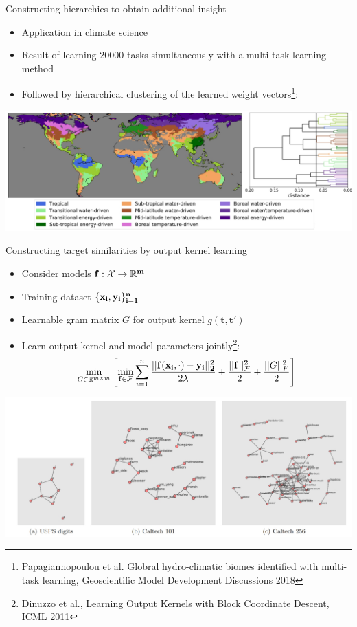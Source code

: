 \documentclass[]{beamer}
\renewcommand{\vec}[1]{\boldsymbol{#1}}
\begin{document}
\begin{frame}{Constructing hierarchies to obtain additional insight}

\begin{itemize}
\item Application in climate science
\item Result of learning 20000 tasks simultaneously with a multi-task learning method
\item Followed by hierarchical clustering of the learned weight vectors\footnote{Papagiannopoulou et al. Globral hydro-climatic biomes identified with multi-task learning, Geoscientific Model Development Discussions 2018}:
\end{itemize}
\begin{center}
\includegraphics[scale=0.2]{Figures/biomes} 
\end{center}

\end{frame}

\begin{frame}{Constructing target similarities by output kernel learning}

\begin{itemize}
\item Consider models $\bf{f}: \mathcal{X} \rightarrow \mathbb{R}^m$
\item Training dataset $\{\bf{x}_i,\bf{y}_i\}_{i=1}^n$
\item Learnable gram matrix $G$ for output kernel $g(\vec{t},\vec{t}')$
\item Learn output kernel and model parameters jointly\footnote{Dinuzzo et al., Learning Output Kernels with Block Coordinate Descent, ICML 2011}:
$$\min_{G \in \mathbb{R}^{m \times m}} \left[ \min_{\bf{f} \in \mathcal{F}} \sum_{i=1}^n \frac{||\bf{f}(\bf{x}_i,\cdot) - \bf{y}_i||_2^2}{2\lambda} + \frac{||\bf{f}||^2_\mathcal{F}}{2} + \frac{
||G||^2_F}{2} \right]$$
\end{itemize}
\begin{center}
\includegraphics[scale=0.2]{Figures/okl}
\end{center}

\end{frame}
\end{document}
